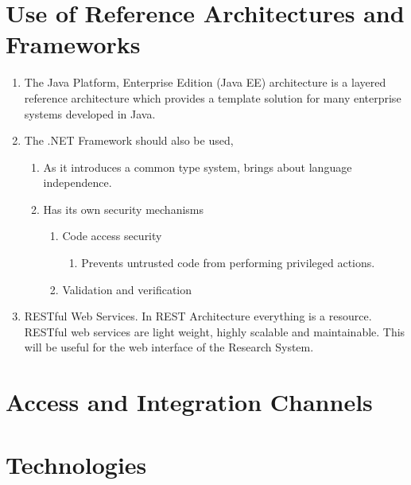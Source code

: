 \documentclass[hidelinks,a4paper,12pt]{article}
\begin{document}
		\section{Use of Reference Architectures and Frameworks}
			\begin{enumerate}
				\item  The Java Platform, Enterprise Edition (Java EE) architecture is a layered reference architecture which provides a template solution for many enterprise systems developed in Java.
				\item  The .NET Framework should also be used, 
				\begin{enumerate}
					\item  As it introduces a common type system, brings about language independence.
					\item  Has its own security mechanisms
					\begin{enumerate}
						\item  Code access security
						\begin{enumerate}
							\item  Prevents untrusted code from performing privileged actions.
						\end{enumerate}
						\item  Validation and verification
					\end{enumerate}
				\end{enumerate}
				\item  RESTful Web Services. In REST Architecture everything is a resource. RESTful web services are light weight, highly scalable and maintainable. This will be useful for the web interface of the Research System.
			\end{enumerate}
		
		
		
		\section{Access and Integration Channels}
		\section{Technologies}
		 

 



 
\end{document}
